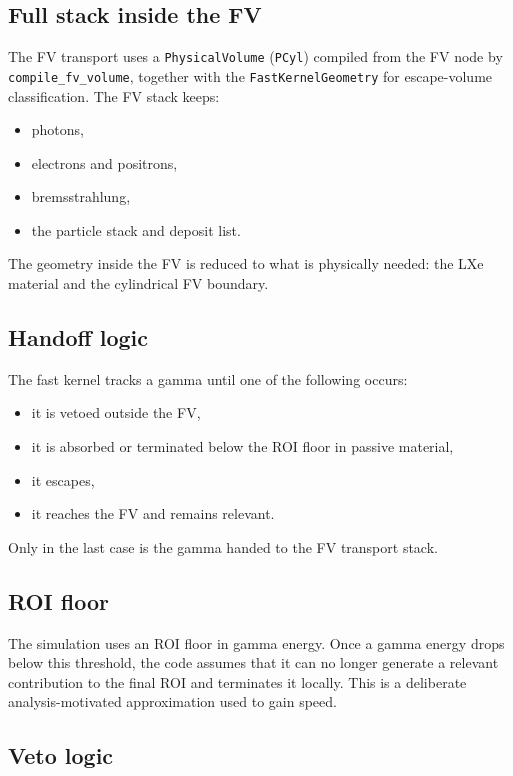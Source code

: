 \documentclass[11pt]{article}
\begin{document}
\subsection{Full stack inside the FV}

The FV transport uses a \texttt{PhysicalVolume} (\texttt{PCyl}) compiled from
the FV node by \texttt{compile\_fv\_volume}, together with the
\texttt{FastKernelGeometry} for escape-volume classification. The FV stack keeps:

\begin{itemize}
\item photons,
\item electrons and positrons,
\item bremsstrahlung,
\item the particle stack and deposit list.
\end{itemize}

The geometry inside the FV is reduced to what is physically needed:
the LXe material and the cylindrical FV boundary.

\subsection{Handoff logic}

The fast kernel tracks a gamma until one of the following occurs:

\begin{itemize}
\item it is vetoed outside the FV,
\item it is absorbed or terminated below the ROI floor in passive material,
\item it escapes,
\item it reaches the FV and remains relevant.
\end{itemize}

Only in the last case is the gamma handed to the FV transport stack.

\subsection{ROI floor}

The simulation uses an ROI floor in gamma energy. Once a gamma energy drops
below this threshold, the code assumes that it can no longer generate a relevant
contribution to the final ROI and terminates it locally. This is a deliberate
analysis-motivated approximation used to gain speed.

\subsection{Veto logic}
\end{document}

